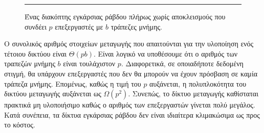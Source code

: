 \documentclass[12pt,a4paper]{article} %
\begin{document}
\begin{figure}[H]
\noindent\rule{\textwidth}{0.2pt}
\caption{Ένας διακόπτης εγκάρσιας ράβδου πλήρως χωρίς αποκλεισμούς που συνδέει $p$ επεξεργαστές
με $b$ τράπεζες μνήμης.}
\label{fig:graph33}
\end{figure}
\vspace{0.3cm}

Ο συνολικός αριθμός στοιχείων μεταγωγής που απαιτούνται για την υλοποίηση ενός
τέτοιου δικτύου είναι $\Theta(pb)$. Είναι λογικό να υποθέσουμε ότι ο αριθμός των
τραπεζών μνήμης $b$ είναι τουλάχιστον $p$. Διαφορετικά, σε οποιαδήποτε δεδομένη
στιγμή, θα υπάρχουν επεξεργαστές που δεν θα μπορούν να έχουν πρόσβαση σε καμία
τράπεζα μνήμης. Επομένως, καθώς η τιμή του $p$ αυξάνεται, η πολυπλοκότητα του
δικτύου μεταγωγής αυξάνεται ως $\Omega(p^2)$. Συνεπώς, το δίκτυο μεταγωγής
καθίσταται πρακτικά μη υλοποιήσιμο καθώς ο αριθμός των επεξεργαστών γίνεται πολύ
μεγάλος. Κατά συνέπεια, τα δίκτυα εγκάρσιας ράβδου δεν είναι
ιδιαίτερα κλιμακώσιμα ως προς το κόστος.
\end{document}

